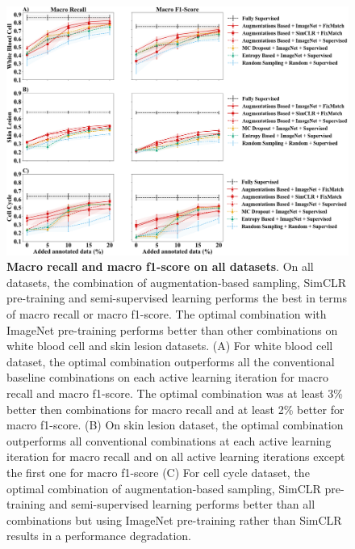 \begin{figure}[htbp]
\centering
\captionsetup{format=plain}
\includegraphics[width=\textwidth]{figures/fig_3_recall_f1.png}
\caption[Macro recall and macro f1-score on all datasets]{\textbf{Macro recall and macro f1-score on all datasets}. On all datasets, the combination of augmentation-based sampling, SimCLR pre-training and semi-supervised learning performs the best in terms of macro recall or macro f1-score. The optimal combination with ImageNet pre-training performs better than other combinations on white blood cell and skin lesion datasets. (A) For white blood cell dataset, the optimal combination outperforms all the conventional baseline combinations on each active learning iteration for macro recall and macro f1-score. The optimal combination was at least 3\% better then combinations for macro recall and at least 2\% better for macro f1-score. (B) On skin lesion dataset, the optimal combination outperforms all conventional combinations at each active learning iteration for macro recall and on all active learning iterations except the first one for macro f1-score (C) For cell cycle dataset, the optimal combination of augmentation-based sampling, SimCLR pre-training and semi-supervised learning performs better than all combinations but using ImageNet pre-training rather than SimCLR results in a performance degradation.}
\label{fig:all_acc_precision}
\end{figure}

